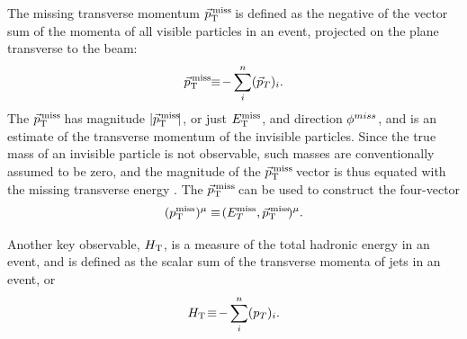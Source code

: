 The missing transverse momentum $\vec{p}_{\text{T}}^{\,\text{miss}}\!$ is defined as the negative of the vector sum of the momenta of all visible particles in an event, projected on the plane transverse to the beam:
\begin{equation}
\vec{p}_{\text{T}}^{\,\text{miss}}\!\!\equiv\!-\sum\limits_{i}^n(\vec{p}_T)_i.
\end{equation}
The $\vec{p}_{\text{T}}^{\,\text{miss}}\!$ has magnitude $|\vec{p}_{\text{T}}^{\,\text{miss}}\!|$, or just $E_{\text{T}}^{\rm miss}$, and direction ${\phi}^{miss}$, and is an estimate of the transverse momentum of the invisible particles. Since the true mass of an invisible particle is not observable, such masses are conventionally assumed to be zero, and the magnitude of the $\vec{p}_{\text{T}}^{\,\text{miss}}\!$ vector is thus equated with the missing transverse energy \MET. The $\vec{p}_{\text{T}}^{\,\text{miss}}\!$ can be used to construct the four-vector
\begin{equation}
(p_{\text{T}}^{\text{miss}})^\mu\equiv\!(E_T^{\text{miss}},\vec{p}_{\text{T}}^{\,\text{miss}}\!)^\mu.
\end{equation}

Another key observable, $H_{\rm T}$, is a measure of the total hadronic energy in an event, and is defined as the scalar sum of the transverse momenta of jets in an event, or 
\begin{equation}
H_{\rm T}\!\equiv\!-\sum\limits_{i}^n(p_T)_i.
\end{equation}




